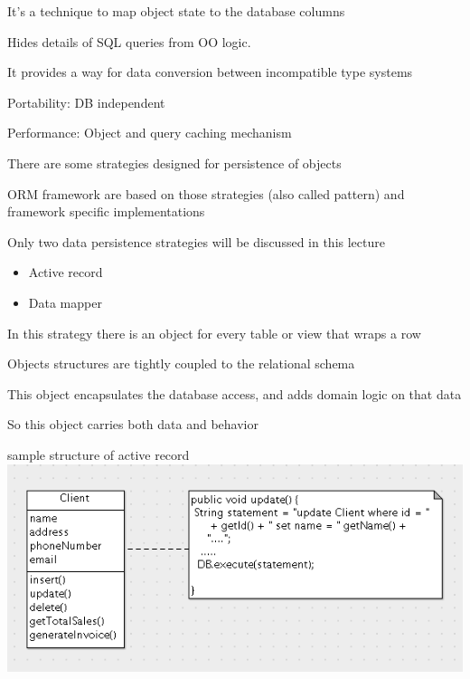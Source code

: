 \documentclass{beamer}
\begin{document}
\begin{slide}{
\item It's a technique to map object state to the database columns
\pause
\item Hides details of SQL queries from OO logic.
\pause 
\item It provides a way for data conversion between incompatible type systems 
\pause 
\item Portability: DB independent
\pause 
\item Performance: Object and query caching mechanism   
}
\end{slide}


\begin{slide}{
\item There are some strategies designed for persistence of objects
\item ORM framework are based on those strategies (also called pattern) and framework specific implementations
\item Only two data persistence strategies will be discussed in this lecture
\pause 
\begin{itemize}
\item Active record
\item Data mapper 
\end{itemize}
}\end{slide}

\begin{slide}{
\item In this strategy there is an object for every table or view that wraps a row
\pause
\item Objects structures are tightly coupled to the relational schema
\pause
\item This object encapsulates the database access, and adds domain logic on that data
\pause
\item So this object carries both data and behavior 

}\end{slide}


\begin{slide}{
\item sample structure of active record 
\\
\includegraphics[scale=0.3]{img/activeRecordSketch.png}
}\end{slide}
\end{document}
